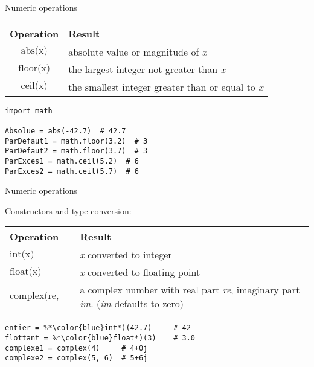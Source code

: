 \begin{frame}[fragile]{Numeric operations}

  \begin{center}

%

  \begin{tabular}{| c | l |}
    \hline
    \textbf{Operation} & \textbf{Result} \\
    \hline
    $ \text{abs(x)} $ 	& absolute value or magnitude of \textit{x} \\
    $ \text{floor(x)} $ 	& the largest integer not greater than \textit{x} \\
    $ \text{ceil(x)} $ 	& the smallest integer greater than or equal to \textit{x} \\
    \hline
  \end{tabular}

  \medskip

  \begin{lstlisting}[style=python,morekeywords={floor,ceil}]
import math

Absolue = abs(-42.7)  # 42.7
ParDefaut1 = math.floor(3.2)  # 3
ParDefaut2 = math.floor(3.7)  # 3
ParExces1 = math.ceil(5.2)  # 6
ParExces2 = math.ceil(5.7)  # 6 \end{lstlisting}

  \end{center}

\end{frame}


\begin{frame}[fragile]{Numeric operations}

  \begin{center}

  Constructors and type conversion:

  \bigskip

  \begin{tabular}{| l | p{5cm} |}
    \hline
    \textbf{Operation} & \textbf{Result} \\
    \hline
    $ \text{int(x)} $ 	& \textit{x} converted to integer \\
    $ \text{float(x)} $ 	& \textit{x} converted to floating point \\
    $ \text{complex(re, im)} $ 	& a complex number with real part \textit{re}, imaginary part \textit{im}. (\textit{im} defaults to zero) \\
    \hline
  \end{tabular}

  \medskip

  \begin{lstlisting}[style=python,morekeywords={int,float}]
entier = %*\color{blue}int*)(42.7)     # 42
flottant = %*\color{blue}float*)(3)    # 3.0
complexe1 = complex(4)     # 4+0j
complexe2 = complex(5, 6)  # 5+6j \end{lstlisting}

  \end{center}

\end{frame}


